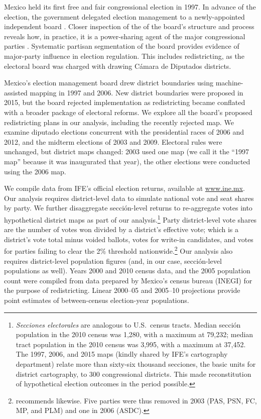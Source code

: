 \documentclass[letter,12pt]{article}
\begin{document}

Mexico held its first free and fair congressional election in 1997. In advance of the election, the government delegated election management to a newly-appointed independent board \citep[the Federal Electoral Institute IFE, see][]{lujambio.vives.2008}. Closer inspection of the of the board's structure and process reveals how, in practice, it is a power-sharing agent of the major congressional parties \citep{estevez.magar.rosas.2008}. Systematic partisan segmentation of the board provides evidence of major-party influence in election regulation. This includes redistricting, as the electoral board was charged with drawing C\'amara de Diputados districts. 

Mexico's election management board drew district boundaries using machine-assisted mapping in 1997 and 2006. New district boundaries were proposed in 2015, but the board rejected implementation as redistricting became conflated with a broader package of electoral reforms. We explore all the board's proposed redistricting plans in our analysis, including the recently rejected map. We examine diputado elections concurrent with the presidential races of 2006 and 2012, and the midterm elections of 2003 and 2009. Electoral rules were unchanged, but district maps changed: 2003 used one map (we call it the ``1997 map'' because it was inaugurated that year), the other elections were conducted using the 2006 map. 

We compile data from IFE's official election returns, available at \url{www.ine.mx}. Our analysis requires district-level data to simulate national vote and seat shares by party. We further disaggregate secci\'on-level returns to re-aggregate votes into hypothetical district maps as part of our analysis.\footnote{\emph{Secciones electorales} are analogous to U.S.\ census tracts. Median secci\'on population in the 2010 census was 1,280, with a maximum at 79,232; median tract population in the 2010 census was 3,995, with a maximum at 37,452. The 1997, 2006, and 2015 maps (kindly shared by IFE's cartography department) relate more than sixty-six thousand secciones, the basic units for district cartography, to 300 congressional districts. This made reconstitution of hypothetical election outcomes in the period possible.} Party district-level vote shares are the number of votes won divided by a district's effective vote; which is a district's vote total minus voided ballots, votes for write-in candidates, and votes for parties failing to clear the 2\% threshold nationwide.\footnote{\citet[][:fn. 4]{linzerSeatVoteElasticity2012} recommends likewise. Five parties were thus removed in 2003 (PAS, PSN, FC, MP, and PLM) and one in 2006 (ASDC).} Our analysis also requires district-level population figures (and, in our case, secci\'on-level populations as well). Years 2000 and 2010 census data, and the 2005 population count were compiled from data prepared by Mexico's census bureau (INEGI) for the purpose of redistricting. Linear 2000--05 and 2005--10 projections provide point estimates of between-census election-year populations. 
\end{document}
